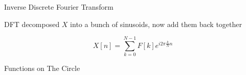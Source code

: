 \documentclass{beamer}
\begin{document}
\begin{frame}{Inverse Discrete Fourier Transform}

DFT decomposed $X$ into a bunch of sinusoids, now add them back together

\[ X[n] = \sum_{k = 0}^{N-1} F[k] e^{i 2 \pi \frac{k}{N} n} \]

\end{frame}

\begin{frame}{Functions on The Circle}

\end{frame}
\end{document}
